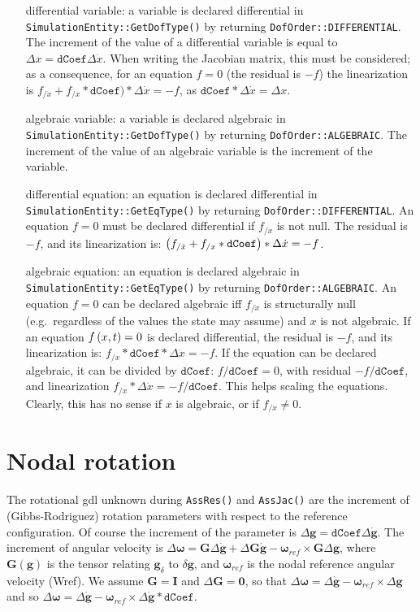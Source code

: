 \documentclass[10pt,dvips]{report}
\newcommand{\T}[1]{\boldsymbol{#1}}
\begin{document}
\begin{itemize}

\item[differential variable:] a variable is declared differential
in \texttt{SimulationEntity::GetDofType()} 
by returning \texttt{DofOrder::DIFFERENTIAL}.
The increment of the value of a differential variable is equal 
to $\Delta x=\texttt{dCoef}\Delta \dot{x}$.
When writing the Jacobian matrix, this must be considered;
as a consequence, for an equation $f=0$ (the residual is $-f$)
the linearization is 
$f_{/\dot{x}}+f_{/x}*\texttt{dCoef})*\Delta \dot{x}=-f$, 
as $\texttt{dCoef}*\Delta \dot{x}=\Delta x$.

\item[algebraic variable:] a variable is declared algebraic
in \texttt{SimulationEntity::GetDofType()}
by returning \texttt{DofOrder::ALGEBRAIC}.
The increment of the value of an algebraic variable is the increment 
of the variable.

\item[differential equation:] an equation is declared differential
in \texttt{SimulationEntity::GetEqType()}
by returning \texttt{DofOrder::DIFFERENTIAL}.
An equation $f=0$ must be declared differential if $f_{/\dot{x}}$ is not null.
The residual is $-f$, and its linearization is:
$\left( f_{/\dot{x}}+f_{/x}*\texttt{dCoef} \right)*\Delta \dot{x}=-f$.

\item[algebraic equation:] an equation is declared algebraic
in \texttt{SimulationEntity::GetEqType()}
by returning \texttt{DofOrder::ALGEBRAIC}.
An equation $f=0$ can be declared algebraic iff $f_{/\dot{x}}$ 
is structurally null (e.g.\ regardless of the values the state may assume) 
and $x$ is not algebraic.
If an equation $f\left( x,t \right)=0$ is declared differential,
the residual is $-f$, and its linearization is:
$f_{/x}*\texttt{dCoef}*\Delta \dot{x}=-f$.
If the equation can be declared algebraic, it can be divided by $\texttt{dCoef}$:
$f/\texttt{dCoef}=0$, with residual $-f/\texttt{dCoef}$,
and linearization $f_{/x}*\Delta \dot{x} = -f/\texttt{dCoef}$.
This helps scaling the equations.
Clearly, this has no sense if $x$ is algebraic,
or if $f_{/\dot{x}} \neq 0$.

\end{itemize}

\section{Nodal rotation}
The rotational gdl unknown during \texttt{AssRes()} and \texttt{AssJac()}
are the increment of (Gibbs-Rodriguez) rotation parameters
with respect to the reference configuration.
Of course the increment of the parameter is
$\Delta \T g=\texttt{dCoef}\Delta \dot{\T g}$.
The increment of angular velocity is 
$\Delta \T \omega = \T G\Delta \dot{\T g}+ \Delta \T G \dot{\T g}-
\T \omega_{ref}\times \T G \Delta \T g$,
where $\T G(\T g)$ is the tensor relating $\T g_\delta$ to $\delta \T g$,
and $\T \omega_{ref}$ is the nodal reference angular velocity (Wref).
We assume $\T G = \T I$ and $\Delta \T G = \T 0$,
so that $\Delta \T \omega = \Delta \dot{\T g}-\T \omega_{ref}\times\Delta \T g$
and so $\Delta \T \omega = \Delta \dot{\T g}-
\T \omega_{ref}\times\Delta \dot{\T g} * \texttt{dCoef}$.
\end{document}
